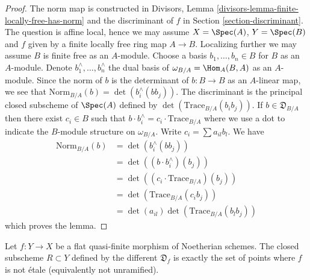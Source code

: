 \begin{proof}
The norm map is constructed in
Divisors, Lemma \ref{divisors-lemma-finite-locally-free-has-norm}
and the discriminant of $f$ in Section \ref{section-discriminant}.
The question is affine local, hence we may assume $X = \Spec(A)$,
$Y = \Spec(B)$ and $f$ given by a finite locally free ring map $A \to B$.
Localizing further we may assume $B$ is finite free as an $A$-module.
Choose a basis $b_1, \ldots, b_n \in B$ for $B$ as an $A$-module.
Denote $b_1^\wedge, \ldots, b_n^\wedge$ the dual basis of
$\omega_{B/A} = \Hom_A(B, A)$ as an $A$-module.
Since the norm of $b$ is the determinant of $b : B \to B$ as an
$A$-linear map, we see that
$\text{Norm}_{B/A}(b) = \det(b_i^\wedge(bb_j))$.
The discriminant is the principal closed subscheme of $\Spec(A)$
defined by $\det(\text{Trace}_{B/A}(b_ib_j))$.
If $b \in \mathfrak{D}_{B/A}$ then
there exist $c_i \in B$ such that
$b \cdot b_i^\wedge = c_i \cdot \text{Trace}_{B/A}$ where
we use a dot to indicate the $B$-module structure on $\omega_{B/A}$.
Write $c_i = \sum a_{il} b_l$.
We have
\begin{align*}
\text{Norm}_{B/A}(b)
& =
\det(b_i^\wedge(bb_j)) \\
& =
\det( (b \cdot b_i^\wedge)(b_j)) \\
& =
\det((c_i \cdot \text{Trace}_{B/A})(b_j)) \\
& =
\det(\text{Trace}_{B/A}(c_ib_j)) \\
& =
\det(a_{il}) \det(\text{Trace}_{B/A}(b_l b_j))
\end{align*}
which proves the lemma.
\end{proof}

\begin{lemma}
\label{lemma-different-ramification}
Let $f : Y \to X$ be a flat quasi-finite morphism of Noetherian schemes.
The closed subscheme $R \subset Y$ defined by the different $\mathfrak{D}_f$
is exactly the set of points where $f$ is not \'etale
(equivalently not unramified).
\end{lemma}

